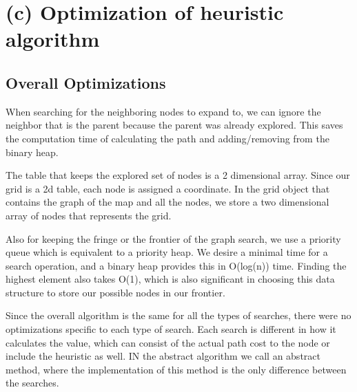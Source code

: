 \section{(c) Optimization of heuristic algorithm}

\subsection{Overall Optimizations}

When searching for the neighboring nodes to expand to, we can ignore the neighbor that is the parent because the parent was already explored. This saves the computation time of calculating the path and adding/removing from the binary heap.

The table that keeps the explored set of nodes is a 2 dimensional array. Since our grid is a 2d table, each node is assigned a coordinate. In the grid object that contains the graph of the map and all the nodes, we store a two dimensional array of nodes that represents the grid.

Also for keeping the fringe or the frontier of the graph search, we use a priority queue which is equivalent to a priority heap. We desire a minimal time for a search operation, and a binary heap provides this in O(log(n)) time. Finding the highest element also takes O(1), which is also significant in choosing this data structure to store our possible nodes in our frontier.

Since the overall algorithm is the same for all the types of searches, there were no optimizations specific to each type of search. Each search is different in how it calculates the value, which can consist of the actual path cost to the node or include the heuristic as well. IN the abstract algorithm we call an abstract method, where the implementation of this method is the only difference between the searches.